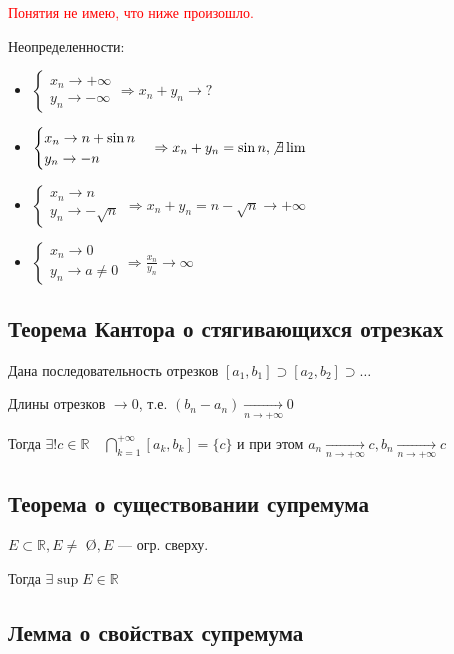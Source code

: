 \textcolor{red}{Понятия не имею, что ниже произошло.}

Неопределенности:
\begin{itemize}
    \item $
    \begin{cases}
        x_n\to +\infty \\
        y_n\to-\infty
    \end{cases}
\Rightarrow x_n+y_n\to?$
\item $\begin{cases}
    x_n\to n+\sin n \\
    y_n\to-n
\end{cases}
\Rightarrow x_n+y_n=\sin n, \not\exists\lim$
\item $\begin{cases}
    x_n\to n \\
    y_n\to -\sqrt n
\end{cases}
\Rightarrow x_n+y_n=n-\sqrt n\to+\infty$
\item $\begin{cases}
    x_n\to 0 \\
    y_n\to a\not = 0
\end{cases}
\Rightarrow \frac{x_n}{y_n}\to\infty$
\end{itemize}

\subsection{Теорема Кантора о стягивающихся отрезках}

Дана последовательность отрезков $[a_1, b_1]\supset[a_2, b_2]\supset\ldots$

Длины отрезков $\to 0$, т.е. $(b_n-a_n)\xrightarrow[n\to+\infty]{} 0$

Тогда $\exists!c\in\mathbb{R} \quad \bigcap\limits_{k=1}^{+\infty}[a_k, b_k]=\{c\}$ и при этом $a_n\xrightarrow[n\to+\infty]{} c, b_n\xrightarrow[n\to+\infty]{} c$

\subsection{Теорема о существовании супремума}

$E\subset \mathbb{R}, E\not=$ \O $, E$ --- огр. сверху.

Тогда $\exists\sup E \in\mathbb{R}$

\subsection{Лемма о свойствах супремума}

